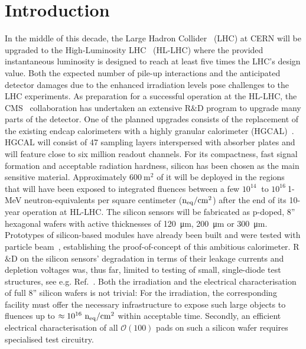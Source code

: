 \section{Introduction}
\label{sec:introduction}
In the middle of this decade, the Large Hadron Collider~\cite{evans:2008} (LHC) at CERN will be upgraded to the High-Luminosity LHC~\cite{hl-lhc-tdr:2017} (HL-LHC) where the provided instantaneous luminosity is designed to reach at least five times the LHC's design value.
Both the expected number of pile-up interactions and the anticipated detector damages due to the enhanced irradiation levels pose challenges to the LHC experiments.\newline
As preparation for a successful operation at the HL-LHC, the CMS~\cite{cms:2008} collaboration has undertaken an extensive R$\&$D program to upgrade many parts of the detector.
One of the planned upgrades consists of the replacement of the existing endcap calorimeters with a highly granular calorimeter (HGCAL)~\cite{hgcal-tdr:2018}.
HGCAL will consist of 47 sampling layers interspersed with absorber plates and will feature close to six million readout channels.
For its compactness, fast signal formation and acceptable radiation hardness, silicon has been chosen as the main sensitive material.
Approximately $\SI{600}{\metre\squared}$ of it will be deployed in the regions that will have been exposed to integrated fluences between a few $10^{14}~$ to $10^{16}~$1-MeV neutron-equivalents per square centimeter ($\mathrm{n_{eq}}/\mathrm{cm}^{2}$) after the end of its 10-year operation at HL-LHC. 
The silicon sensors will be fabricated as p-doped, 8'' hexagonal wafers with active thicknesses of \SI{120}{\micro\metre}, \SI{200}{\micro\metre} or \SI{300}{\micro\metre}.\newline
Prototypes of silicon-based modules have already been built and were tested with particle beam~\cite{cms_hgc-2016-beamtests,H1:2020,H2:2020}, establishing the proof-of-concept of this ambitious calorimeter.
R$\&$D on the silicon sensors' degradation in terms of their leakage currents and depletion voltages was, thus far, limited to testing of small, single-diode test structures, see e.g. Ref.~\cite{Curr_s_2017}.
Both the irradiation and the electrical characterisation of full 8'' silicon wafers is not trivial: 
For the irradiation, the corresponding facility must offer the necessary infrastructure to expose such large objects to fluences up to $\approx 10^{16}~\mathrm{n_{eq}}/\mathrm{cm}^{2}$ within acceptable time.
Secondly, an efficient electrical characterisation of all $\mathcal{O}(100)$ pads on such a silicon wafer requires specialised test circuitry.\newline
